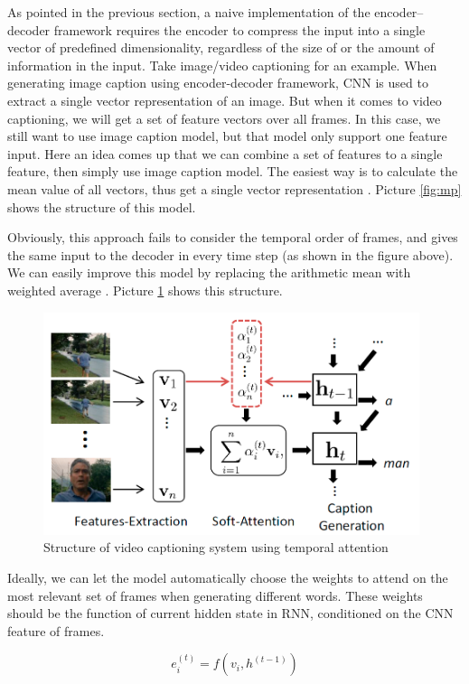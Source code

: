 As pointed in the previous section, a naive implementation of the encoder–decoder framework requires the encoder to compress the input into a single vector of predefined dimensionality, regardless of the size of or the amount of information in the input. Take image/video captioning for an example. When generating image caption using encoder-decoder framework, CNN is used to extract a single vector representation of an image. But when it comes to video captioning, we will get a set of feature vectors over all frames. In this case, we still want to use image caption model, but that model only support one feature input. Here an idea comes up that we can combine a set of features to a single feature, then simply use image caption model. The easiest way is to calculate the mean value of all vectors, thus get a single vector representation \cite{venugopalan2014translating}. Picture \ref{fig:mp} shows the structure of this model.

Obviously, this approach fails to consider the temporal order of frames, and gives the same input to the decoder in every time step (as shown in the figure above). We can easily improve this model by replacing the arithmetic mean with weighted average \cite{yao2015describing}. Picture \ref{fig:sa} shows this structure.

\begin{figure}[htbp]
\centering
\includegraphics[width=11cm]{resources/sa.png}
\caption{Structure of video captioning system using temporal attention \cite{yao2015describing}}
\label{fig:sa}
\end{figure}

Ideally, we can let the model automatically choose the weights to attend on the most relevant set of frames when generating different words. These weights should be the function of current hidden state in RNN, conditioned on the CNN feature of frames.

\begin{equation}
e_{i}^{(t)} = f(v_i, h^{(t-1)})
\end{equation}

